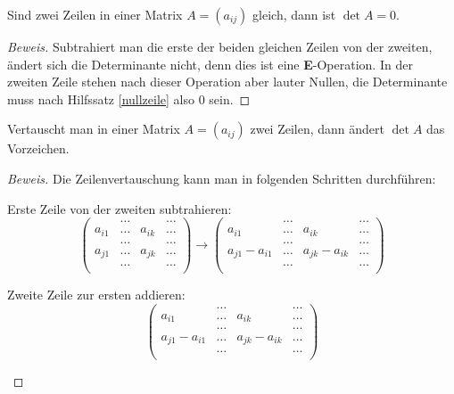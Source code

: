 \begin{hilfssatz}
Sind zwei Zeilen in einer Matrix $A=(a_{ij})$
gleich, dann ist $\det A=0$.
\end{hilfssatz}
\begin{proof}[Beweis]
Subtrahiert man die erste der beiden gleichen Zeilen von der
zweiten, ändert sich die Determinante nicht, denn dies ist eine
{\bf E}-Operation.
In der zweiten Zeile stehen nach dieser Operation
aber lauter Nullen, die Determinante muss nach Hilfssatz \ref{nullzeile}
also $0$ sein.
\end{proof}

\begin{hilfssatz}
Vertauscht man in einer Matrix $A=(a_{ij})$ zwei
Zeilen, dann ändert $\det A$ das Vorzeichen.
\end{hilfssatz}
\begin{proof}[Beweis]
Die Zeilenvertauschung kann man in folgenden Schritten durchführen:
\begin{compactenum}
\item Erste Zeile von der zweiten subtrahieren:
\[
\begin{pmatrix}
      &\dots&      &\dots\\
a_{i1}&\dots&a_{ik}&\dots\\
      &\dots&      &\dots\\
a_{j1}&\dots&a_{jk}&\dots\\
      &\dots&      &\dots\\
\end{pmatrix}
\rightarrow
\begin{pmatrix}
             &\dots&             &\dots\\
a_{i1}       &\dots&a_{ik}       &\dots\\
             &\dots&             &\dots\\
a_{j1}-a_{i1}&\dots&a_{jk}-a_{ik}&\dots\\
             &\dots&             &\dots\\
\end{pmatrix}
\]
\item Zweite Zeile zur ersten addieren:
\[
\begin{pmatrix}
             &\dots&             &\dots\\
a_{i1}       &\dots&a_{ik}       &\dots\\
             &\dots&             &\dots\\
a_{j1}-a_{i1}&\dots&a_{jk}-a_{ik}&\dots\\
             &\dots&             &\dots\\

\end{pmatrix}\]
\end{compactenum}
\end{proof}

